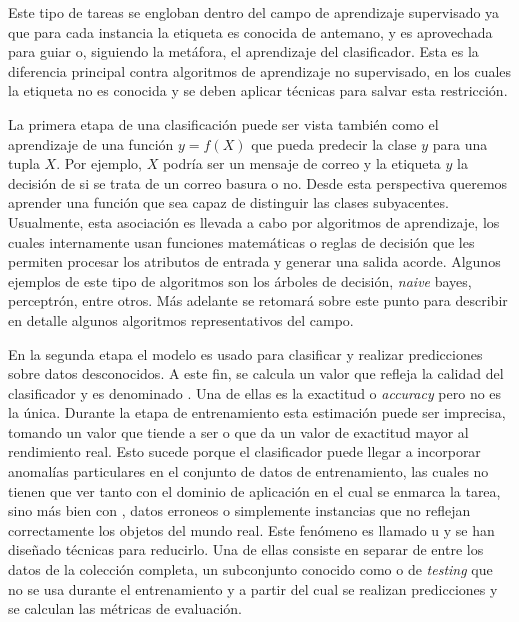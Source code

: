 Este tipo de tareas se engloban dentro del campo de aprendizaje supervisado ya
que para cada instancia la etiqueta es conocida de antemano, y es aprovechada
para guiar o, siguiendo la metáfora,  el aprendizaje del
clasificador. Esta es la diferencia principal contra algoritmos de aprendizaje
no supervisado, en los cuales la etiqueta no es conocida y se deben aplicar
técnicas para salvar esta restricción.

La primera etapa de una clasificación puede ser vista también como el
aprendizaje de una función $y=f(X)$ que pueda predecir la clase $y$ para una
tupla $X$. Por ejemplo, $X$ podría ser un mensaje de correo y la etiqueta $y$ la
decisión de si se trata de un correo basura o no. Desde esta perspectiva
queremos aprender una función que sea capaz de distinguir las clases
subyacentes.  Usualmente, esta asociación es llevada a cabo por algoritmos de
aprendizaje, los cuales internamente usan funciones matemáticas o reglas de
decisión que les permiten procesar los atributos de entrada y generar una salida
acorde. Algunos ejemplos de este tipo de algoritmos son los árboles de decisión,
\textit{naive} bayes, perceptrón, entre otros. Más adelante se retomará sobre
este punto para describir en detalle algunos algoritmos representativos del
campo.

En la segunda etapa el modelo es usado para clasificar y realizar predicciones
sobre datos desconocidos. A este fin, se calcula un valor que refleja la calidad
del clasificador y es denominado . Una de ellas
es la exactitud o \textit{accuracy} pero no es la única.  Durante la etapa de
entrenamiento esta estimación puede ser imprecisa, tomando un valor que tiende a
ser  o que da un valor de exactitud mayor al rendimiento
real.  Esto sucede porque el clasificador puede llegar a incorporar anomalías
particulares en el conjunto de datos de entrenamiento, las cuales no tienen que
ver tanto con el dominio de aplicación en el cual se enmarca la tarea, sino más
bien con , datos erroneos o simplemente instancias que no
reflejan correctamente los objetos del mundo real. Este fenómeno es llamado
 u  y se han diseñado técnicas
para reducirlo. Una de ellas consiste en separar de entre los datos de la
colección completa, un subconjunto conocido como  o
de \textit{testing} que no se usa durante el entrenamiento y a partir del cual
se realizan predicciones y se calculan las métricas de evaluación. 

